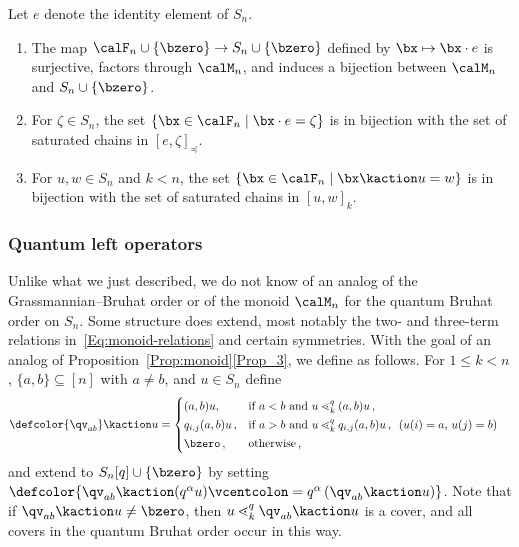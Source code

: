\begin{proposition}\label{Prop:monoid}
    Let $e$ denote the identity element of $S_n$.
    \begin{enumerate}
        \item
            The map $\calF_n\cup\{\bzero\}\to S_n\cup\{\bzero\}$ defined by
            $\bx\mapsto \bx \cdot e$ is surjective, factors through $\calM_n$,
            and induces a bijection between $\calM_n$ and $S_n \cup \{\bzero\}$.
        \item
            For $\zeta\in S_n$, the set $\{\bx\in\calF_n\mid \bx \cdot
            e = \zeta\}$ is in bijection with the set of saturated chains in
            $[e,\zeta]_\preceq$.
        \item\label{Prop_3}
            For $u,w\in S_n$ and $k<n$, the set $\{ \bx\in\calF_n\mid \bx\kaction u=w\}$ is
            in bijection with the set of saturated chains in $[u,w]_k$.
    \end{enumerate}
\end{proposition}

\subsubsection{Quantum left operators}
\label{SS:left-quantum-operators}

Unlike what we just described, we do not know of an analog of the Grassmannian--Bruhat
order or of the monoid $\calM_n$ for the quantum Bruhat order on $S_n$.
Some structure does extend, most notably the two- and three-term relations in~\eqref{Eq:monoid-relations} and certain symmetries.
With the goal of an analog of Proposition~\ref{Prop:monoid}\eqref{Prop_3}, we define 
 as follows.
For $1\leq k<n$, $\{a,b\}\subseteq [n]$ with  $a\ne b$, and $u\in S_n$ define
\begin{align} \label{Eq:Def-k-action}
    \defcolor{{\qv}_{ab}} \kaction u
    &=
    \begin{cases}
        (a,b) u, \hphantom{q_{i,j}} & \text{if $a<b$ and $u \lessdot_k^q (a,b)u\,,$}            \\[0.4ex]
          q_{i,j} (a,b) u\,, & \text{if $a>b$ and  $u\lessdot_k^q q_{i,j} (a,b) u$\,,\ \ 
           ($u(i)=a$, $u(j)=b$)} \\[0.4ex]
        \bzero\,, & \text{otherwise\,,}
    \end{cases}
\end{align}
and extend to  $S_n[q] \cup \{\bzero\}$ by setting
$\defcolor{\qv_{ab} \kaction (q^\alpha u) \vcentcolon= q^\alpha \, (\qv_{ab} \kaction u)}$.
Note that if \mbox{${\qv}_{ab} \kaction u\neq\bzero$}, then $u\lessdot_k^q{\qv}_{ab} \kaction u$ is a cover, and all covers in the
quantum Bruhat order occur in this way.

